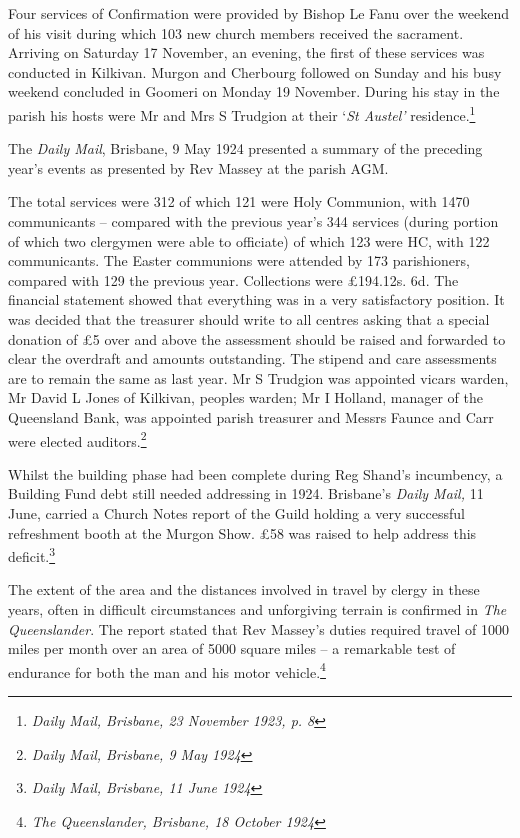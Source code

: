 Four services of Confirmation were provided by Bishop Le Fanu over the weekend of his visit during which 103 new church members received the sacrament. Arriving on Saturday 17 November, an evening, the first of these services was conducted in Kilkivan. Murgon and Cherbourg followed on Sunday and his busy weekend concluded in Goomeri on Monday 19 November. During his stay in the parish his hosts were Mr and Mrs S Trudgion at their `\emph{St Austel'} residence.\footnote{\emph{Daily Mail, Brisbane, 23 November 1923, p. 8}}

The \emph{Daily Mail}, Brisbane, 9 May 1924 presented a summary of the preceding year's events as presented by Rev Massey at the parish AGM.

The total services were 312 of which 121 were Holy Communion, with 1470 communicants -- compared with the previous year's 344 services (during portion of which two clergymen were able to officiate) of which 123 were HC, with 122 communicants. The Easter communions were attended by 173 parishioners, compared with 129 the previous year. Collections were £194.12s. 6d. The financial statement showed that everything was in a very satisfactory position. It was decided that the treasurer should write to all centres asking that a special donation of £5 over and above the assessment should be raised and forwarded to clear the overdraft and amounts outstanding. The stipend and care assessments are to remain the same as last year. Mr S Trudgion was appointed vicars warden, Mr David L Jones of Kilkivan, peoples warden; Mr I Holland, manager of the Queensland Bank, was appointed parish treasurer and Messrs Faunce and Carr were elected auditors.\footnote{\emph{Daily Mail, Brisbane, 9 May 1924}}

Whilst the building phase had been complete during Reg Shand's incumbency, a Building Fund debt still needed addressing in 1924. Brisbane's \emph{Daily Mail,} 11 June, carried a Church Notes report of the Guild holding a very successful refreshment booth at the Murgon Show. £58 was raised to help address this deficit.\footnote{\emph{Daily Mail, Brisbane, 11 June 1924}}

The extent of the area and the distances involved in travel by clergy in these years, often in difficult circumstances and unforgiving terrain is confirmed in \emph{The Queenslander}. The report stated that Rev Massey's duties required travel of 1000 miles per month over an area of 5000 square miles -- a remarkable test of endurance for both the man and his motor vehicle.\footnote{\emph{The Queenslander, Brisbane, 18 October 1924}}

